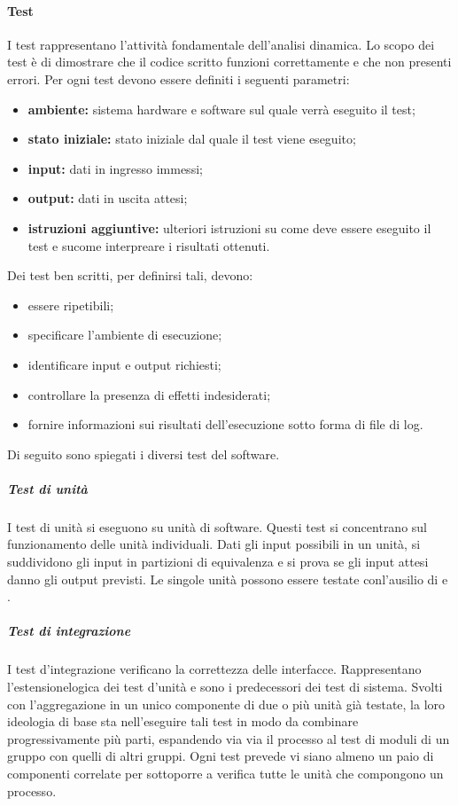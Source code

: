 			\paragraph{Test}
			I test rappresentano l'attività fondamentale dell'analisi dinamica. Lo scopo dei test è di dimostrare che il codice scritto funzioni correttamente e che non presenti errori. 
			Per ogni test devono essere definiti i seguenti parametri: 
			\begin{itemize}
			\item \textbf{ambiente:} sistema hardware e software sul quale verrà eseguito il test;
			\item \textbf{stato iniziale:} stato iniziale dal quale il test viene eseguito;
			\item \textbf{input:} dati in ingresso immessi;
			\item \textbf{output:} dati in uscita attesi;
			\item \textbf{istruzioni aggiuntive:} ulteriori istruzioni su come deve essere eseguito il test e sucome interpreare i risultati ottenuti.
			\end{itemize}
			Dei test ben scritti, per definirsi tali, devono:
			\begin{itemize}
			\item essere ripetibili;
			\item specificare l'ambiente di esecuzione;
			\item identificare input e output richiesti;
			\item controllare la presenza di effetti indesiderati;
			\item fornire informazioni sui risultati dell’esecuzione sotto forma di file di log.
			\end{itemize}
			Di seguito sono spiegati i diversi test del software.
			\subparagraph{Test di unità}
			I test di unità si eseguono su unità di software. Questi test si concentrano sul funzionamento delle unità individuali. Dati gli input possibili in un unità, si suddividono gli input in partizioni di equivalenza e si prova se gli input attesi danno gli output previsti. Le singole unità possono essere testate conl'ausilio di  e .
			\subparagraph{Test di integrazione}
			I test d’integrazione verificano la correttezza delle interfacce. Rappresentano l’estensionelogica dei test d’unità e sono i predecessori dei test di sistema. Svolti con l’aggregazione in un unico componente di due o più unità già testate, la loro ideologia di base sta nell’eseguire tali test in modo da combinare progressivamente più parti, espandendo via via il processo al test di moduli di un gruppo con quelli di altri gruppi. Ogni test prevede vi siano almeno un paio di componenti correlate per sottoporre a verifica tutte le unità che compongono un processo.
